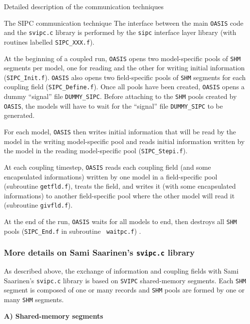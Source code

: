 \begin{section}{Detailed description of the communication techniques}
\begin{subsection}{The SIPC communication technique}
The interface between the main  {\tt OASIS} code and the {\tt svipc.c} 
library is performed by the {\tt sipc} interface layer library (with
routines labelled {\tt SIPC\_XXX.f}).

At the beginning of a coupled run, {\tt OASIS} opens two model-specific pools of 
{\tt SHM} segments per model, one for reading and the other for 
writing initial 
information ({\tt SIPC\_Init.f}). {\tt OASIS} also opens two field-specific pools of 
{\tt SHM} segments for each coupling field 
({\tt SIPC\_De\-fine.f}). Once 
all pools have been  created, {\tt OASIS} opens a dummy ``signal'' file {\tt DUMMY\_SIPC}.
Before attaching to the {\tt SHM} pools created by {\tt OASIS}, the models will
have to wait for the ``signal'' file {\tt DUMMY\_SIPC} to be generated.

For each model, {\tt OASIS} then writes initial information that will be read by 
the model in the writing model-specific pool and reads initial information 
written by the model in the reading model-specific pool ({\tt SIPC\_Stepi.f}). 

At each coupling timestep, {\tt OASIS} reads each coupling field (and some 
encapsulated informations) written by one model in a field-specific pool 
(subroutine {\tt getfld.f}), treats the field, and 
writes it (with some encapsulated informations) to another 
field-specific pool where the other model will read it (subroutine {\tt givfld.f}).

At the end of the run, {\tt OASIS} waits for all models to end, then
destroys all {\tt SHM} pools ({\tt SIPC\_End.f} in subroutine {\tt
waitpc.f}) .

\subsubsection{More details on Sami Saarinen's {\tt svipc.c} library}

As described above, the exchange of information and coupling fields with 
Sami Saarinen's {\tt svipc.c} library is based on {\tt SVIPC} shared-memory segments.  
Each {\tt SHM} segment is composed of one or many records and {\tt SHM} pools are formed
by one or many {\tt SHM} segments. 

\vspace{.6truecm}
{\bf A) Shared-memory segments}
\vspace{.3truecm}



\end{subsection}
\end{section}

